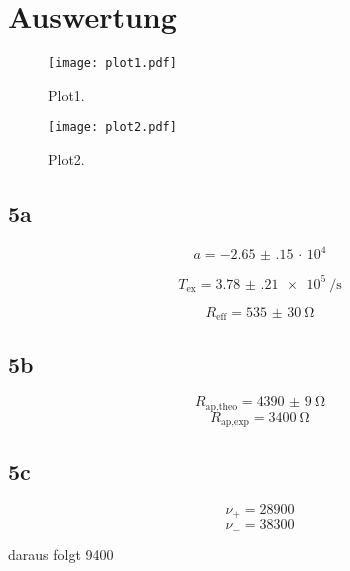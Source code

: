 \section{Auswertung}
\label{sec:Auswertung}

\begin{figure}
  \centering
  \texttt{[image: plot1.pdf]}
  \caption{Plot1.}
  \label{fig:plot1}
\end{figure}

\begin{figure}
  \centering
  \texttt{[image: plot2.pdf]}
  \caption{Plot2.}
  \label{fig:plot2}
\end{figure}


\subsection{5a}
\begin{equation}
   a = \num{-2.65(15)}\, \cdot\, 10^{4}
\end{equation}

\begin{equation}
   T_{\text{ex}} = \SI{3.78(21)e5}{\per\second}
\end{equation}

\begin{equation}
R_{\text{eff}} = \SI{535(30)}{\ohm}
\end{equation}


\subsection{5b}

\begin{equation}
  R_{\text{ap,theo}} = \SI{4390(9)}{\ohm}
  \end{equation}
\begin{equation}
  R_{\text{ap,exp}} = \SI{3400}{\ohm}
\end{equation}


\subsection{5c}

\begin{equation}
  \nu_{+} = 28900
\end{equation}
\begin{equation}
  \nu_{-} = 38300
\end{equation}

daraus folgt 9400
